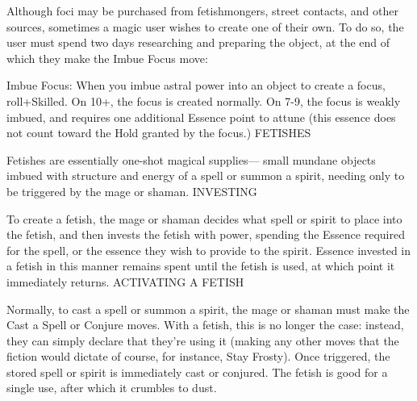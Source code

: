 Although foci may be purchased from fetishmongers, street contacts, and other sources, sometimes a magic user wishes to create one of their own. To do so, the user must spend two days researching and preparing the object, at the end of which they make the Imbue Focus move:

Imbue Focus: When you imbue astral power into an object to create a focus, roll+Skilled. On 10+, the focus is created normally. On 7-9, the focus is weakly imbued, and requires one additional Essence point to attune (this essence does not count toward the Hold granted by the focus.)
FETISHES

Fetishes are essentially one-shot magical supplies— small mundane objects imbued with structure and energy of a spell or summon a spirit, needing only to be triggered by the mage or shaman.
INVESTING

To create a fetish, the mage or shaman decides what spell or spirit to place into the fetish, and then invests the fetish with power, spending the Essence required for the spell, or the essence they wish to provide to the spirit. Essence invested in a fetish in this manner remains spent until the fetish is used, at which point it immediately returns.
ACTIVATING A FETISH

Normally, to cast a spell or summon a spirit, the mage or shaman must make the Cast a Spell or Conjure moves. With a fetish, this is no longer the case: instead, they can simply declare that they’re using it (making any other moves that the fiction would dictate of course, for instance, Stay Frosty). Once triggered, the stored spell or spirit is immediately cast or conjured. The fetish is good for a single use, after which it crumbles to dust.
